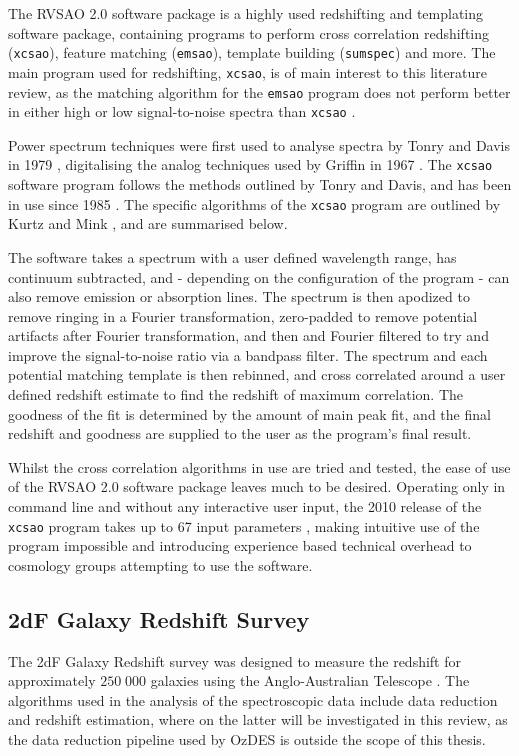 \documentclass[titlesmallcaps, examinerscopy, copyrightpage]{uqthesis}
\begin{document}
The RVSAO 2.0 software package is a highly used redshifting and templating software package, containing programs to perform cross correlation redshifting (\verb+xcsao+), feature matching (\verb+emsao+), template building (\verb+sumspec+) and more. The main program used for redshifting, \verb+xcsao+, is of main interest to this literature review, as the matching algorithm for the \verb+emsao+ program does not perform better in either high or low signal-to-noise spectra than \verb+xcsao+ \cite{kurtz1998rvsao}.

Power spectrum techniques were first used to analyse spectra by Tonry and Davis in 1979 \cite{tonry1979survey}, digitalising the analog techniques used by Griffin in 1967 \cite{griffin1967photoelectric}. The \verb+xcsao+ software program follows the methods outlined by Tonry and Davis, and has been in use since 1985 \cite{kurtz1998rvsao}. The specific algorithms of the \verb+xcsao+ program are outlined by Kurtz and Mink \cite{kurtz1998rvsao}, and are summarised below.

The software takes a spectrum with a user defined wavelength range, has continuum subtracted, and - depending on the configuration of the program - can also remove emission or absorption lines. The spectrum is then apodized to remove ringing in a Fourier transformation, zero-padded to remove potential artifacts after Fourier transformation, and then and Fourier filtered to try and improve the signal-to-noise ratio via a bandpass filter. The spectrum and each potential matching template is then rebinned, and cross correlated around a user defined redshift estimate to find the redshift of maximum correlation. The goodness of the fit is determined by the amount of main peak fit, and the final redshift and goodness are supplied to the user as the program's final result.

Whilst the cross correlation algorithms in use are tried and tested, the ease of use of the RVSAO 2.0 software package leaves much to be desired. Operating only in command line and without any interactive user input, the 2010 release of the \verb+xcsao+ program takes up to 67 input parameters \cite{parameters}, making intuitive use of the program impossible and introducing experience based technical overhead to cosmology groups attempting to use the software.

\subsection{2dF Galaxy Redshift Survey}
The 2dF Galaxy Redshift survey was designed to measure the redshift for approximately $250\;000$ galaxies using the Anglo-Australian Telescope \cite{colless20012df}. The algorithms used in the analysis of the spectroscopic data include data reduction and redshift estimation, where on the latter will be investigated in this review, as the data reduction pipeline used by OzDES is outside the scope of this thesis.
\end{document}
